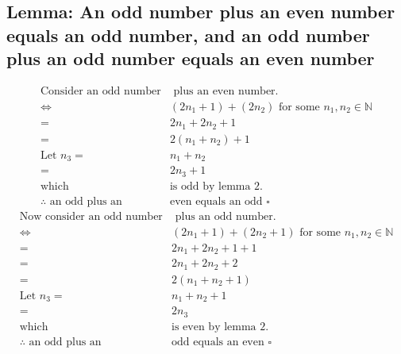 \documentclass[11pt, oneside]{article}   	%
\begin{document}
	\subsection{Lemma: An odd number plus an even number equals an odd number, and an odd number plus an odd number equals an even number}
		\begin{align*}
			\text{Consider an odd number}&\text{ plus an even number.}\\
			\iff & (2n_1+1) + (2n_2) \text{ for some } n_1, n_2 \in \mathbb{N}\\
			= & 2n_1 + 2n_2 + 1\\
			= & 2(n_1 + n_2) + 1\\
			\text{Let } n_3 =& n_1 + n_2\\
			= & 2n_3 + 1\\
			\text{which }& \text{is odd by lemma 2}.\\
			\therefore \text{ an odd plus an }&\text{even equals an odd } \square
		\end{align*}
		\begin{align*}
			\text{Now consider an odd number}&\text{ plus an odd number.}\\
			\iff & (2n_1+1) + (2n_2+1) \text{ for some } n_1, n_2 \in \mathbb{N}\\
			= & 2n_1 + 2n_2 + 1 + 1\\
			= & 2n_1 + 2n_2 + 2\\
			= & 2(n_1 + n_2 + 1)\\
			\text{Let } n_3 = & n_1 + n_2 + 1\\
			= & 2n_3\\
			\text{which }& \text{is even by lemma 2}.\\
			\therefore \text{ an odd plus an }&\text{odd equals an even } \square
		\end{align*}

\end{document}
